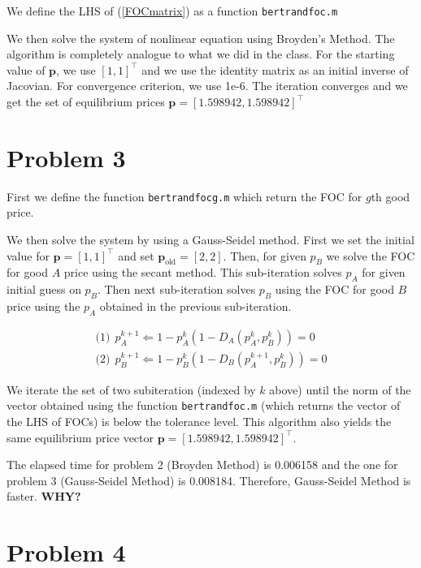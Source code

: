 \documentclass[11pt,letter]{article}
\newcommand{\vect}[1]{\boldsymbol{\mathbf{#1}}}
\newcounter{lem}[section] \setcounter{lem}{0}
\newcommand{\code}[1]{\texttt{#1}}
\begin{document}
We define the LHS of (\ref{FOCmatrix}) as a function \code{bertrandfoc.m}



We then solve the system of nonlinear equation using Broyden's Method. The algorithm is completely analogue to what we did in the class. For the starting value of $\vect{p}$, we use $[1,1]^\top$ and we use the identity matrix as an initial inverse of Jacovian. For convergence criterion, we use 1e-6. The iteration converges and we get the set of equilibrium prices $\vect{p}=[1.598942,1.598942]^\top$

\section*{Problem 3}

First we define the function \code{bertrandfocg.m} which return the FOC for $g$th good price.



We then solve the system by using a Gauss-Seidel method. First we set the initial value for $\vect{p} = [1,1]^\top$ and set $\vect{p}_{\text{old}}=[2,2]$. Then, for given $p_B$ we solve the FOC for good $A$ price using the secant method. This sub-iteration solves $p_A$ for given initial guess on $p_B$. Then next sub-iteration solves $p_B$ using the FOC for good $B$ price using the $p_A$ obtained in the previous sub-iteration. 

\begin{align*}
\text{(1)}\ \  p_A^{k+1}\Leftarrow1-p_A^k(1-D_A(p_A^k,p_B^k))=0 \\
\text{(2)}\ \  p_B^{k+1}\Leftarrow1-p_B^k(1-D_B(p_A^{k+1},p_B^k))=0 
\end{align*}

We iterate the set of two subiteration (indexed by $k$ above) until the norm of the vector obtained using the function \code{bertrandfoc.m} (which returns the vector of the LHS of FOCs) is below the tolerance level. This algorithm also yields the same equilibrium price vector $\vect{p}=[1.598942,1.598942]^\top$. 

The elapsed time for problem 2 (Broyden Method) is 0.006158 and the one for problem 3 (Gauss-Seidel Method) is 0.008184. Therefore, Gauss-Seidel Method is faster. \textbf{WHY?}

\section*{Problem 4}
\end{document}
